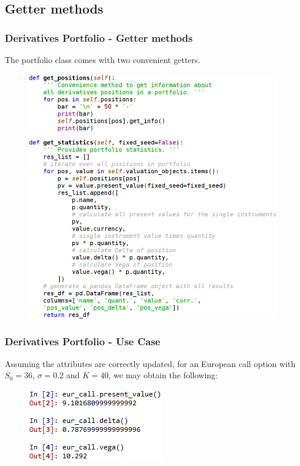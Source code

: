\documentclass{beamer}
\begin{document}
\subsection{Getter methods}
\begin{frame}
\frametitle{Derivatives Portfolio - Getter methods}
The portfolio class comes with two convenient getters.
\begin{figure}[H]
	\includegraphics[scale=0.32]{derivatives_portfolio_getter_methods.png}
\end{figure}
\end{frame}

\begin{frame}
\frametitle{Derivatives Portfolio - Use Case}
Assuming the attributes are correctly updated, for an European call option with $S_{0} = 36$, $\sigma = 0.2$ and $K = 40$, we may obtain the following:
\begin{figure}[H]
	\includegraphics[scale=1.0]{european_exercise_user_case.png}
\end{figure}
\end{frame}
\end{document}
